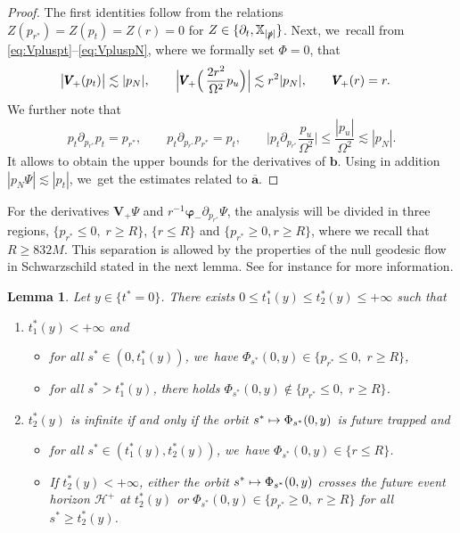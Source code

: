 \documentclass[10pt]{amsart}
\newcommand\mto{\mathchoice{\longmapsto}{\mapsto}{\mapsto}{\mapsto}}
\theoremstyle{plain}
\newtheorem{lemma}[proposition]{Lemma}
\theoremstyle{definition}
\newcommand\T{{\mathbb{X}}}
\begin{document}
\begin{proof}
The first identities follow from the relations $Z(p_{r^*})=Z(p_t)=Z(r)=0$ for $Z \in \{ \partial_t, \T_{|\slashed{p}|} \}$. Next, we~recall from \eqref{eq:Vpluspt}--\eqref{eq:VpluspN}, where we formally set $\Phi=0$, that
\begin{align*}
\big|\pmb{V}_{\! +}(p_t) \big| & \lesssim |p_N|,\qquad \Big| \pmb{V}_{\! +} \Bigl(\, \frac{2r^2 }{\Omega^2}p_u \Bigr) \Big| \lesssim r^2|p_N|,\qquad \pmb{V}_{\! +}(r)=r.
\end{align*}
We further note that
\[
p_t \partial_{p_{r^*}} p_t =p_{r^*},\qquad p_t \partial_{p_{r^*}} p_{r^*} =p_t,\qquad \Big| p_t \partial_{p_{r^*}} \frac{p_u}{\Omega^2} \Big| \leq \frac{|p_u|}{\Omega^2} \lesssim |p_N|.
\]
It allows to obtain the upper bounds for the derivatives of $\pmb{b}$. Using in addition \hbox{$|p_N \Psi| \lesssim |p_t|$}, we~get the estimates related to $\overline{\pmb{a}}$.
\end{proof}

For the derivatives $\pmb{V}_{\! +} \Psi$ and $r^{-1}\pmb{\varphi}_- \partial_{p_{r^*}} \Psi$, the analysis will be divided in three regions, $\{ p_{r^*} \leq 0, \; r \geq R \}$, $\{ r \leq R \}$ and $\{ p_{r^*} \geq 0, r \geq R\}$, where we recall that $R \geq 832M$. This separation is allowed by the properties of the null geodesic flow in Schwarzschild stated in the next lemma. See for instance \cite[Ch.\,13]{O83} for more information.

\begin{lemma}\label{Lemgeodtime}
Let $y \in \{ t^*=0 \}$. There exists $0 \leq t^*_{1}(y) \leq t_2^*(y) \leq + \infty$ such that
\begin{enumerate}
\item $t_1^*(y) <+\infty$ and
\begin{itemize}
\item for all $s^* \in (0,t^*_1(y))$, we~have $\Phi_{s^*}(0,y) \in \{ p_{r^*} \leq 0, \; r \geq R \}$,
\item for all $s^* > t^*_1(y)$, there holds $\Phi_{s^*}(0,y) \notin \{ p_{r^*} \leq 0, \; r \geq R \}$.
\end{itemize}
\item $t_2^*(y)$ is infinite if and only if the orbit $s^* \mto \Phi_{s^*}(0,y)$ is future trapped and
\begin{itemize}
\item for all $s^* \in (t^*_1(y),t_2^*(y))$, we~have $\Phi_{s^*}(0,y) \in \{ r \leq R \}$.
\item If $t^*_2(y)<+\infty$, either the orbit $s^* \mto \Phi_{s^*}(0,y)$ crosses the future event horizon $\mathcal{H}^+$ at $t^*_2(y)$ or $\Phi_{s^*}(0,y) \in \{ p_{r^*} \geq 0, \; r \geq R \}$ for all $s^* \geq t^*_2(y)$.
\end{itemize}
\end{enumerate}
\end{lemma}
\end{document}
